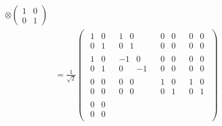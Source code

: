 \documentclass{exam} %
\theoremstyle{plain}
\theoremstyle{definition}
\theoremstyle{remark}
\newcommand{\pmat}[1]{ \begin{pmatrix} #1 \end{pmatrix} }
\numberwithin{equation}{section}  %
\begin{document}
\begin{questions}
\begin{parts}
\begin{solution}
\begin{align*}
{              \otimes
              \pmat{1&0\\0&1}}\\
           &= 
      \frac{1}{\sqrt{2}}
      \pmat{
        \begin{smallmatrix} 1&0\\ 0&1 \end{smallmatrix}&
        \begin{smallmatrix} 1&0\\ 0&1 \end{smallmatrix}&
        \begin{smallmatrix} 0&0\\ 0&0 \end{smallmatrix}&
        \begin{smallmatrix} 0&0\\ 0&0 \end{smallmatrix}\\
        \begin{smallmatrix} 1&0\\ 0&1 \end{smallmatrix}&
        \begin{smallmatrix} -1&0\\ 0&-1 \end{smallmatrix}&
        \begin{smallmatrix} 0&0\\ 0&0 \end{smallmatrix}&
        \begin{smallmatrix} 0&0\\ 0&0 \end{smallmatrix}\\
        \begin{smallmatrix} 0&0\\ 0&0 \end{smallmatrix}&
        \begin{smallmatrix} 0&0\\ 0&0 \end{smallmatrix}&
        \begin{smallmatrix} 1&0\\ 0&1 \end{smallmatrix}&
        \begin{smallmatrix} 1&0\\ 0&1 \end{smallmatrix}\\
        \begin{smallmatrix} 0&0\\ 0&0 \end{smallmatrix}&
}
\end{align*}
\end{solution}
\end{parts}
\end{questions}
\end{document}
